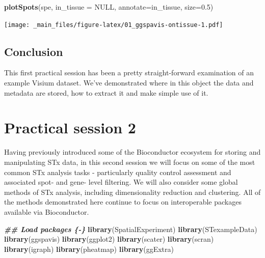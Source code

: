 \documentclass[
]{book}
\newenvironment{Shaded}{\begin{snugshade}}{\end{snugshade}}
\newcommand{\AttributeTok}[1]{\textcolor[rgb]{0.13,0.29,0.53}{#1}}
\newcommand{\ConstantTok}[1]{\textcolor[rgb]{0.56,0.35,0.01}{#1}}
\newcommand{\DocumentationTok}[1]{\textcolor[rgb]{0.56,0.35,0.01}{\textbf{\textit{#1}}}}
\newcommand{\FloatTok}[1]{\textcolor[rgb]{0.00,0.00,0.81}{#1}}
\newcommand{\FunctionTok}[1]{\textcolor[rgb]{0.13,0.29,0.53}{\textbf{#1}}}
\newcommand{\NormalTok}[1]{#1}
\newcommand{\StringTok}[1]{\textcolor[rgb]{0.31,0.60,0.02}{#1}}
\begin{document}
\begin{Shaded}
\begin{Highlighting}[]
\FunctionTok{plotSpots}\NormalTok{(spe, }\AttributeTok{in\_tissue =} \ConstantTok{NULL}\NormalTok{, }\AttributeTok{annotate=}\StringTok{\textquotesingle{}in\_tissue\textquotesingle{}}\NormalTok{, }\AttributeTok{size=}\FloatTok{0.5}\NormalTok{)}
\end{Highlighting}
\end{Shaded}

\texttt{[image: \_main\_files/figure-latex/01\_ggspavis-ontissue-1.pdf]}

\hypertarget{conclusion}{%
\section{Conclusion}\label{conclusion}}

This first practical session has been a pretty straight-forward examination of an example Visium dataset. We've demonstrated where in this object the data and metadata are stored, how to extract it and make simple use of it.

\hypertarget{practical-session-2}{%
\chapter{Practical session 2}\label{practical-session-2}}

Having previously introduced some of the Bioconductor ecosystem for storing and manipulating STx data, in this second session we will focus on some of the most common STx analysis tasks - particularly quality control assessment and associated spot- and gene- level filtering. We will also consider some global methods of STx analysis, including dimensionality reduction and clustering. All of the methods demonstrated here continue to focus on interoperable packages available via Bioconductor.

\begin{Shaded}
\begin{Highlighting}[]
\DocumentationTok{\#\# Load packages \{{-}\}}
\FunctionTok{library}\NormalTok{(SpatialExperiment)}
\FunctionTok{library}\NormalTok{(STexampleData)}
\FunctionTok{library}\NormalTok{(ggspavis)}
\FunctionTok{library}\NormalTok{(ggplot2)}
\FunctionTok{library}\NormalTok{(scater)}
\FunctionTok{library}\NormalTok{(scran)}
\FunctionTok{library}\NormalTok{(igraph)}
\FunctionTok{library}\NormalTok{(pheatmap)}
\FunctionTok{library}\NormalTok{(ggExtra)}
\end{Highlighting}
\end{Shaded}
\end{document}
